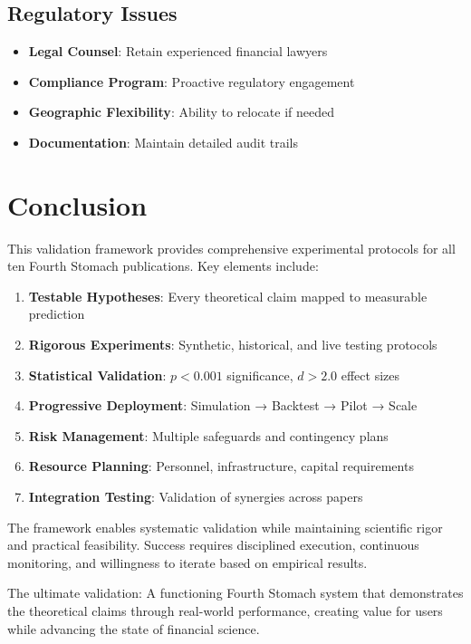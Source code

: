 \documentclass[12pt]{article}
\begin{document}
\subsection{Regulatory Issues}

\begin{itemize}
    \item \textbf{Legal Counsel}: Retain experienced financial lawyers
    \item \textbf{Compliance Program}: Proactive regulatory engagement
    \item \textbf{Geographic Flexibility}: Ability to relocate if needed
    \item \textbf{Documentation}: Maintain detailed audit trails
\end{itemize}

\section{Conclusion}

This validation framework provides comprehensive experimental protocols for all ten Fourth Stomach publications. Key elements include:

\begin{enumerate}
    \item \textbf{Testable Hypotheses}: Every theoretical claim mapped to measurable prediction
    \item \textbf{Rigorous Experiments}: Synthetic, historical, and live testing protocols
    \item \textbf{Statistical Validation}: $p < 0.001$ significance, $d > 2.0$ effect sizes
    \item \textbf{Progressive Deployment}: Simulation → Backtest → Pilot → Scale
    \item \textbf{Risk Management}: Multiple safeguards and contingency plans
    \item \textbf{Resource Planning}: Personnel, infrastructure, capital requirements
    \item \textbf{Integration Testing}: Validation of synergies across papers
\end{enumerate}

The framework enables systematic validation while maintaining scientific rigor and practical feasibility. Success requires disciplined execution, continuous monitoring, and willingness to iterate based on empirical results.

The ultimate validation: A functioning Fourth Stomach system that demonstrates the theoretical claims through real-world performance, creating value for users while advancing the state of financial science.
\end{document}
